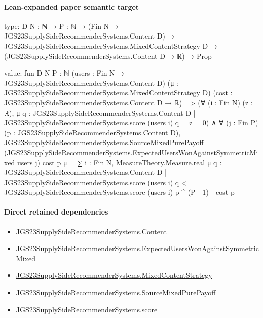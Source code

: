 \documentclass[10pt]{article}
\begin{document}
\paragraph{Lean-expanded paper semantic target}
\begin{ReviewVerbatim}
type:
{D N : ℕ} →
  {P : ℕ} →
    (Fin N → JGS23SupplySideRecommenderSystems.Content D) →
      JGS23SupplySideRecommenderSystems.MixedContentStrategy D →
        (JGS23SupplySideRecommenderSystems.Content D → ℝ) → Prop

value:
fun {D N P : ℕ} (users : Fin N → JGS23SupplySideRecommenderSystems.Content D)
    (μ : JGS23SupplySideRecommenderSystems.MixedContentStrategy D)
    (cost : JGS23SupplySideRecommenderSystems.Content D → ℝ) =>
  (∀ (i : Fin N) (z : ℝ),
      μ {q : JGS23SupplySideRecommenderSystems.Content D | JGS23SupplySideRecommenderSystems.score (users i) q = z} =
        0) ∧
    ∀ (j : Fin P) (p : JGS23SupplySideRecommenderSystems.Content D),
      JGS23SupplySideRecommenderSystems.SourceMixedPurePayoff
          (JGS23SupplySideRecommenderSystems.ExpectedUsersWonAgainstSymmetricMixed users j) cost p μ =
        ∑ i : Fin N,
            MeasureTheory.Measure.real μ
                {q : JGS23SupplySideRecommenderSystems.Content D |
                  JGS23SupplySideRecommenderSystems.score (users i) q <
                    JGS23SupplySideRecommenderSystems.score (users i) p} ^
              (P - 1) -
          cost p
\end{ReviewVerbatim}

\paragraph{Direct retained dependencies}
\begin{itemize}\raggedright
\item \hyperlink{governing-declaration-367305fda50f0ada}{JGS23\allowbreak{}Supply\allowbreak{}Side\allowbreak{}Recommender\allowbreak{}Systems.\allowbreak{}Content}
\item \hyperlink{governing-declaration-3a110916ca7725ab}{JGS23\allowbreak{}Supply\allowbreak{}Side\allowbreak{}Recommender\allowbreak{}Systems.\allowbreak{}Expected\allowbreak{}Users\allowbreak{}Won\allowbreak{}Against\allowbreak{}Symmetric\allowbreak{}Mixed}
\item \hyperlink{governing-declaration-2089965d06cf0282}{JGS23\allowbreak{}Supply\allowbreak{}Side\allowbreak{}Recommender\allowbreak{}Systems.\allowbreak{}Mixed\allowbreak{}Content\allowbreak{}Strategy}
\item \hyperlink{governing-declaration-d3239873ad21d76c}{JGS23\allowbreak{}Supply\allowbreak{}Side\allowbreak{}Recommender\allowbreak{}Systems.\allowbreak{}Source\allowbreak{}Mixed\allowbreak{}Pure\allowbreak{}Payoff}
\item \hyperlink{governing-declaration-e3725af4eb21c4db}{JGS23\allowbreak{}Supply\allowbreak{}Side\allowbreak{}Recommender\allowbreak{}Systems.\allowbreak{}score}
\end{itemize}
\end{document}
